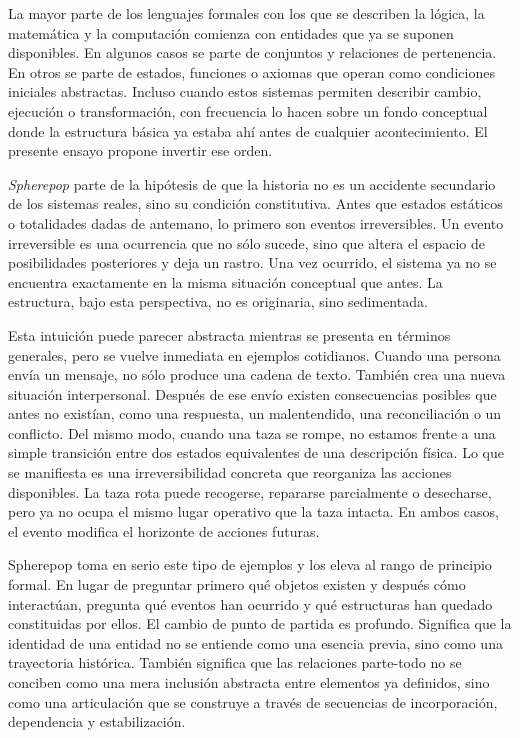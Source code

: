 \documentclass[12pt]{article}
\begin{document}
La mayor parte de los lenguajes formales con los que se describen la lógica, la matemática y la computación comienza con entidades que ya se suponen disponibles. En algunos casos se parte de conjuntos y relaciones de pertenencia. En otros se parte de estados, funciones o axiomas que operan como condiciones iniciales abstractas. Incluso cuando estos sistemas permiten describir cambio, ejecución o transformación, con frecuencia lo hacen sobre un fondo conceptual donde la estructura básica ya estaba ahí antes de cualquier acontecimiento. El presente ensayo propone invertir ese orden.

\emph{Spherepop} parte de la hipótesis de que la historia no es un accidente secundario de los sistemas reales, sino su condición constitutiva. Antes que estados estáticos o totalidades dadas de antemano, lo primero son eventos irreversibles. Un evento irreversible es una ocurrencia que no sólo sucede, sino que altera el espacio de posibilidades posteriores y deja un rastro. Una vez ocurrido, el sistema ya no se encuentra exactamente en la misma situación conceptual que antes. La estructura, bajo esta perspectiva, no es originaria, sino sedimentada.

Esta intuición puede parecer abstracta mientras se presenta en términos generales, pero se vuelve inmediata en ejemplos cotidianos. Cuando una persona envía un mensaje, no sólo produce una cadena de texto. También crea una nueva situación interpersonal. Después de ese envío existen consecuencias posibles que antes no existían, como una respuesta, un malentendido, una reconciliación o un conflicto. Del mismo modo, cuando una taza se rompe, no estamos frente a una simple transición entre dos estados equivalentes de una descripción física. Lo que se manifiesta es una irreversibilidad concreta que reorganiza las acciones disponibles. La taza rota puede recogerse, repararse parcialmente o desecharse, pero ya no ocupa el mismo lugar operativo que la taza intacta. En ambos casos, el evento modifica el horizonte de acciones futuras.

Spherepop toma en serio este tipo de ejemplos y los eleva al rango de principio formal. En lugar de preguntar primero qué objetos existen y después cómo interactúan, pregunta qué eventos han ocurrido y qué estructuras han quedado constituidas por ellos. El cambio de punto de partida es profundo. Significa que la identidad de una entidad no se entiende como una esencia previa, sino como una trayectoria histórica. También significa que las relaciones parte-todo no se conciben como una mera inclusión abstracta entre elementos ya definidos, sino como una articulación que se construye a través de secuencias de incorporación, dependencia y estabilización.
\end{document}

